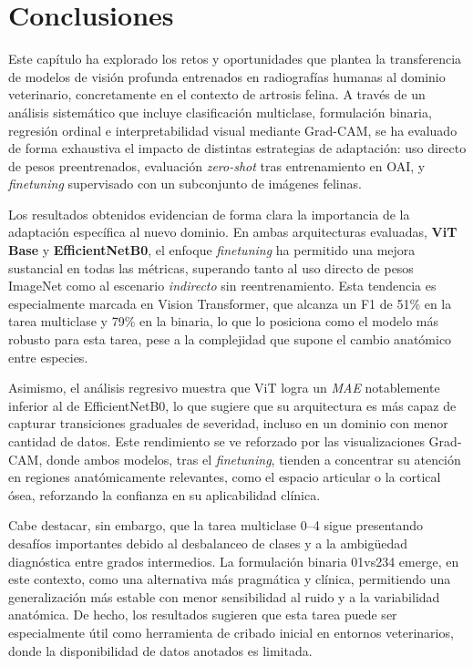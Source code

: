 \documentclass[11pt,spanish,listoffigures,listoftables]{tfgetsinf}
\begin{document}
\section{Conclusiones}

Este capítulo ha explorado los retos y oportunidades que plantea la transferencia de modelos de visión profunda entrenados en radiografías humanas al dominio veterinario, concretamente en el contexto de artrosis felina. A través de un análisis sistemático que incluye clasificación multiclase, formulación binaria, regresión ordinal e interpretabilidad visual mediante Grad-CAM, se ha evaluado de forma exhaustiva el impacto de distintas estrategias de adaptación: uso directo de pesos preentrenados, evaluación \emph{zero-shot} tras entrenamiento en OAI, y \emph{finetuning} supervisado con un subconjunto de imágenes felinas.

Los resultados obtenidos evidencian de forma clara la importancia de la adaptación específica al nuevo dominio. En ambas arquitecturas evaluadas, \textbf{ViT Base} y \textbf{EfficientNetB0}, el enfoque \emph{finetuning} ha permitido una mejora sustancial en todas las métricas, superando tanto al uso directo de pesos ImageNet como al escenario \emph{indirecto} sin reentrenamiento. Esta tendencia es especialmente marcada en Vision Transformer, que alcanza un F1 de 51\% en la tarea multiclase y 79\% en la binaria, lo que lo posiciona como el modelo más robusto para esta tarea, pese a la complejidad que supone el cambio anatómico entre especies.

Asimismo, el análisis regresivo muestra que ViT logra un \emph{MAE} notablemente inferior al de EfficientNetB0, lo que sugiere que su arquitectura es más capaz de capturar transiciones graduales de severidad, incluso en un dominio con menor cantidad de datos. Este rendimiento se ve reforzado por las visualizaciones Grad-CAM, donde ambos modelos, tras el \emph{finetuning}, tienden a concentrar su atención en regiones anatómicamente relevantes, como el espacio articular o la cortical ósea, reforzando la confianza en su aplicabilidad clínica.

Cabe destacar, sin embargo, que la tarea multiclase 0--4 sigue presentando desafíos importantes debido al desbalanceo de clases y a la ambigüedad diagnóstica entre grados intermedios. La formulación binaria 01vs234 emerge, en este contexto, como una alternativa más pragmática y clínica, permitiendo una generalización más estable con menor sensibilidad al ruido y a la variabilidad anatómica. De hecho, los resultados sugieren que esta tarea puede ser especialmente útil como herramienta de cribado inicial en entornos veterinarios, donde la disponibilidad de datos anotados es limitada.
\end{document}
